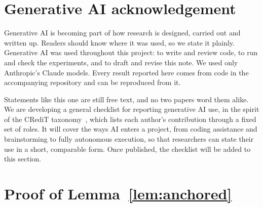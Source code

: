 \documentclass{article}
\begin{document}
\section*{Generative AI acknowledgement}
Generative AI is becoming part of how research is designed, carried out and written up. Readers should know where it was used, so we state it plainly. Generative AI was used throughout this project: to write and review code, to run and check the experiments, and to draft and revise this note. We used only Anthropic's Claude models. Every result reported here comes from code in the accompanying repository and can be reproduced from it.

Statements like this one are still free text, and no two papers word them alike. We are developing a general checklist for reporting generative AI use, in the spirit of the CRediT taxonomy~\citep{brand2015}, which lists each author's contribution through a fixed set of roles. It will cover the ways AI enters a project, from coding assistance and brainstorming to fully autonomous execution, so that researchers can state their use in a short, comparable form. Once published, the checklist will be added to this section.




\appendix
\section{Proof of Lemma~\ref{lem:anchored}}
\label{app:proof}
\end{document}
